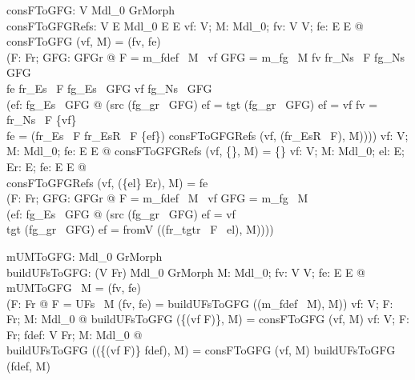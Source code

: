 \begin{axdef}
  consFToGFG: V \cross  Mdl_0 \fun  GrMorph\\
  consFToGFGRefs: V \cross  \power  E \cross  Mdl_0 \fun  E \pfun  E
\where
  \forall  vf: V; M: Mdl_0; fv: V \pfun  V; fe: E \pfun  E @ \\ \quad 
  consFToGFG (vf, M) = (fv, fe) \iff  \\ \qquad  
  	(\exists  F: Fr; GFG: GFGr @ F = m\_fdef~ M~ vf \land  GFG = m\_fg~ M \land  fv \in  fr\_Ns~ F \fun  fg\_Ns~ GFG \\ \qquad   
	\land  fe \in  fr\_Es~ F \fun  fg\_Es~ GFG \land  vf \in  fg\_Ns~ GFG \\ \qquad 
	\land  (\exists  ef: fg\_Es~ GFG @ (src (fg\_gr~ GFG) ef = tgt (fg\_gr~ GFG) ef = vf \land  fv = fr\_Ns~ F \cross  \{vf\} \\ \qquad  \quad 
	\land  fe = (fr\_Es~ F \setminus  fr\_EsR~ F \cross  \{ef\}) \cup  consFToGFGRefs (vf, (fr\_EsR~ F), M))))
\also
  \forall  vf: V; M: Mdl_0; fe: E \pfun  E @ consFToGFGRefs (vf, \{\}, M) = \{\}
\also  
  \forall  vf: V; M: Mdl_0; el: E; Er: \power  E; fe: E \pfun  E @ \\ \quad 
   consFToGFGRefs (vf, (\{el\} \cup  Er), M) = fe \iff \\ \qquad  
     (\exists  F: Fr; GFG: GFGr @ F = m\_fdef~ M~ vf \land  GFG = m\_fg~ M \\ \qquad 
     \land  (\exists  ef: fg\_Es~ GFG @ (src (fg\_gr~ GFG) ef = vf \\ \qquad 
     \land  tgt (fg\_gr~ GFG) ef = fromV ((fr\_tgtr~ F~ el), M))))
\end{axdef}

\begin{axdef}
  mUMToGFG: Mdl_0 \fun  GrMorph\\
  buildUFsToGFG: (V \pfun  Fr) \cross  Mdl_0 \fun  GrMorph
\where
  \forall  M: Mdl_0; fv: V \pfun  V; fe: E \pfun  E @ mUMToGFG~ M = (fv, fe) \iff \\ \quad  
    (\exists  F: Fr @ F = UFs~ M \land  (fv, fe) = buildUFsToGFG ((m\_fdef~ M), M))
\also
  \forall  vf: V; F: Fr; M: Mdl_0 @ buildUFsToGFG (\{(vf \mapsto  F)\}, M) = consFToGFG (vf, M)
\also
  \forall  vf: V; F: Fr; fdef: V \pfun  Fr; M: Mdl_0 @ \\ \quad 
  	 buildUFsToGFG ((\{(vf \mapsto  F)\} \cup  fdef), M) = consFToGFG (vf, M) \UGM buildUFsToGFG (fdef, M)
\end{axdef}

